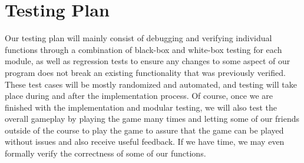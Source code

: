 \documentclass{scrreprt}
\begin{document}
\section{Testing Plan}
Our testing plan will mainly consist of debugging and verifying individual functions through a combination of black-box and white-box testing for each module, as well as regression tests to ensure any changes to some aspect of our program does not break an existing functionality that was previously verified. These test cases will be mostly randomized and automated, and testing will take place during and after the implementation process. Of course, once we are finished with the implementation and modular testing, we will also test the overall gameplay by playing the game many times and letting some of our friends outside of the course to play the game to assure that the game can be played without issues and also receive useful feedback. If we have time, we may even formally verify the correctness of some of our functions. 

\end{document}
